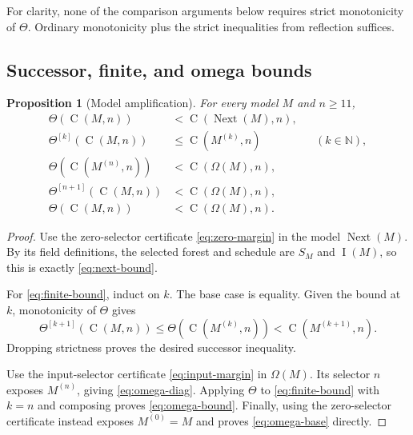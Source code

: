\documentclass[11pt,letterpaper]{article}
\newtheorem{proposition}[theorem]{Proposition}
\theoremstyle{definition}
\newcommand{\N}{\mathbb N}
\newcommand{\Next}{\operatorname{Next}}
\newcommand{\Val}{\operatorname{C}}
\newcommand{\idx}{\operatorname{I}}
\newcommand{\Iter}[2]{#1^{[#2]}}
\begin{document}
For clarity, none of the comparison arguments below requires strict
monotonicity of $\Theta$. Ordinary monotonicity plus the strict inequalities
from reflection suffices.

\subsection{Successor, finite, and omega bounds}

\begin{proposition}[Model amplification]\label{prop:amplification}
For every model $M$ and $n\ge11$,
\begin{align}
 \Theta(\Val(M,n))&<\Val(\Next(M),n),\label{eq:next-bound}\\
 \Iter\Theta k(\Val(M,n))&\le\Val(M^{(k)},n)
          &&(k\in\N),\label{eq:finite-bound}\\
 \Theta(\Val(M^{(n)},n))&<\Val(\Omega(M),n),\label{eq:omega-diag}\\
 \Iter\Theta{n+1}(\Val(M,n))&<\Val(\Omega(M),n),\label{eq:omega-bound}\\
 \Theta(\Val(M,n))&<\Val(\Omega(M),n).\label{eq:omega-base}
\end{align}
\end{proposition}
\begin{proof}
Use the zero-selector certificate \eqref{eq:zero-margin} in the model
$\Next(M)$. By its field definitions, the selected forest and schedule are
$S_M$ and $\idx(M)$, so this is exactly \eqref{eq:next-bound}.

For \eqref{eq:finite-bound}, induct on $k$. The base case is equality. Given
the bound at $k$, monotonicity of $\Theta$ gives
\[
 \Iter\Theta{k+1}(\Val(M,n))
 \le\Theta(\Val(M^{(k)},n))
 <\Val(M^{(k+1)},n).
\]
Dropping strictness proves the desired successor inequality.

Use the input-selector certificate \eqref{eq:input-margin} in $\Omega(M)$.
Its selector $n$ exposes $M^{(n)}$, giving \eqref{eq:omega-diag}. Applying
$\Theta$ to \eqref{eq:finite-bound} with $k=n$ and composing proves
\eqref{eq:omega-bound}. Finally, using the zero-selector certificate instead
exposes $M^{(0)}=M$ and proves \eqref{eq:omega-base} directly.
\end{proof}
\end{document}
